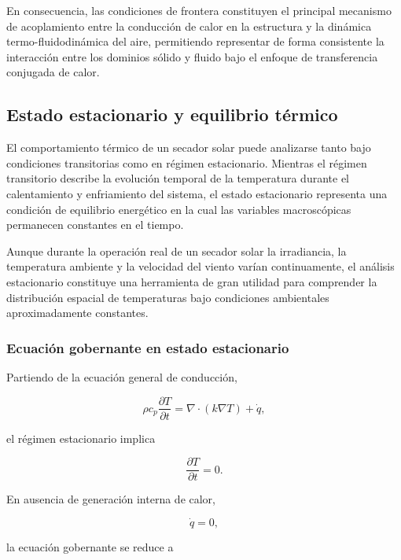 En consecuencia, las condiciones de frontera constituyen el principal mecanismo de acoplamiento entre la conducción de calor en la estructura y la dinámica termo-fluidodinámica del aire, permitiendo representar de forma consistente la interacción entre los dominios sólido y fluido bajo el enfoque de transferencia conjugada de calor.


\subsection{Estado estacionario y equilibrio térmico}

El comportamiento térmico de un secador solar puede analizarse tanto bajo condiciones transitorias como en régimen estacionario. Mientras el régimen transitorio describe la evolución temporal de la temperatura durante el calentamiento y enfriamiento del sistema, el estado estacionario representa una condición de equilibrio energético en la cual las variables macroscópicas permanecen constantes en el tiempo.

Aunque durante la operación real de un secador solar la irradiancia, la temperatura ambiente y la velocidad del viento varían continuamente, el análisis estacionario constituye una herramienta de gran utilidad para comprender la distribución espacial de temperaturas bajo condiciones ambientales aproximadamente constantes.

\subsubsection{Ecuación gobernante en estado estacionario}

Partiendo de la ecuación general de conducción,

\begin{equation}
\rho c_p
\frac{\partial T}{\partial t}
=
\nabla\cdot(k\nabla T)
+
\dot q,
\end{equation}

el régimen estacionario implica

\begin{equation}
\frac{\partial T}{\partial t}=0.
\end{equation}

En ausencia de generación interna de calor,

\[
\dot q=0,
\]

la ecuación gobernante se reduce a

